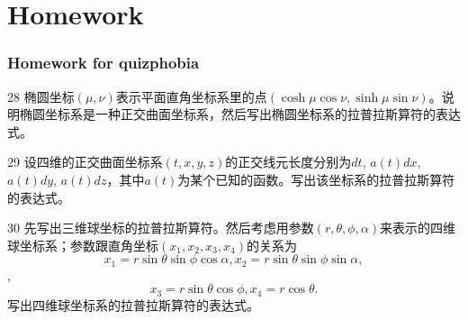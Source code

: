 \documentclass[CJK]{beamer}
\begin{document}
\section{Homework}

\begin{frame}
  \frametitle{Homework for quizphobia}
  
  \bitem
\item[28]{椭圆坐标$(\mu,\nu)$表示平面直角坐标系里的点$(\cosh \mu \cos\nu, \sinh\mu\sin\nu)$。说明椭圆坐标系是一种正交曲面坐标系，然后写出椭圆坐标系的拉普拉斯算符的表达式。}
\item[29]{设四维的正交曲面坐标系$(t,x,y,z)$的正交线元长度分别为$dt$, $a(t)dx$, $a(t)dy$, $a(t)dz$，其中$a(t)$为某个已知的函数。写出该坐标系的拉普拉斯算符的表达式。}
\item[30]{先写出三维球坐标的拉普拉斯算符。然后考虑用参数$(r, \theta, \phi, \alpha)$来表示的四维球坐标系；参数跟直角坐标$(x_1, x_2, x_3,x_4)$的关系为 $$x_1 = r\sin\theta\sin\phi\cos\alpha, x_2=r\sin\theta\sin\phi\sin\alpha,$$,
  $$x_3=r\sin\theta\cos\phi, x_4 = r\cos\theta.$$  写出四维球坐标系的拉普拉斯算符的表达式。}
  \eitem

  
\end{frame}

\ech
\end{document}
